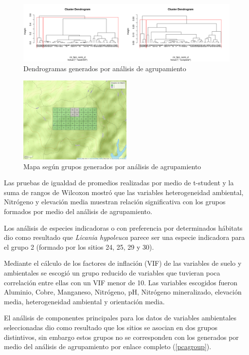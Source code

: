 \documentclass[11pt,]{article}
\begin{document}
\begin{figure}
\centering
\includegraphics[width=1.00000\textwidth]{Clusters.png}
\caption{Dendrogramas generados por análisis de
agrupamiento\label{clusters}}
\end{figure}

\begin{figure}
\centering
\includegraphics[width=0.50000\textwidth]{mapa_ward_k2.png}
\caption{Mapa según grupos generados por análisis de
agrupamiento\label{mapagrupos}}
\end{figure}

Las pruebas de igualdad de promedios realizadas por medio de t-student y
la suma de rangos de Wilcoxon mostró que las variables heterogeneidad
ambiental, Nitrógeno y elevación media muestran relación significativa
con los grupos formados por medio del análisis de agrupamiento.

Los análisis de especies indicadoras o con preferencia por determinados
hábitats dio como resultado que \emph{Licania hypoleuca} parece ser una
especie indicadora para el grupo 2 (formado por los sitios 24, 25, 29 y
30).

Mediante el cálculo de los factores de inflación (VIF) de las variables
de suelo y ambientales se escogió un grupo reducido de variables que
tuvieran poca correlación entre ellas con un VIF menor de 10. Las
variables escogidos fueron Aluminio, Cobre, Manganeso, Nitrógeno, pH,
Nitrógeno mineralizado, elevación media, heterogeneidad ambiental y
orientación media.

El análisis de componentes principales para los datos de variables
ambientales seleccionadas dio como resultado que los sitios se asocian
en dos grupos distintivos, sin embargo estos grupos no se corresponden
con los generados por medio del análisis de agrupamiento por enlace
completo (\ref{pcagroup}).
\end{document}
